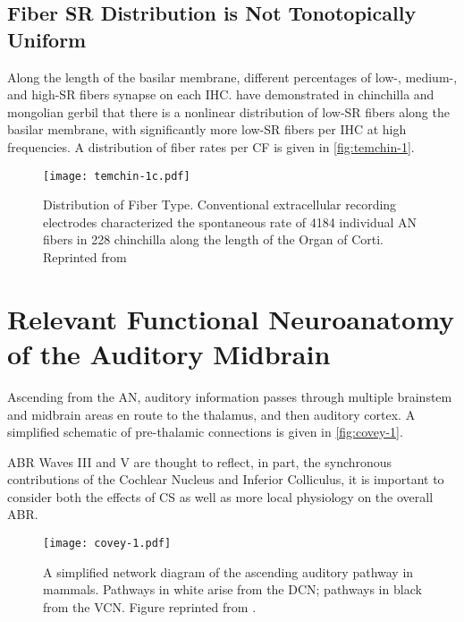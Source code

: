 \subsection{Fiber SR Distribution is Not Tonotopically Uniform} %
\label{sub:fiber_rates_are_tonotopically_nonuniform}
Along the length of the basilar membrane, different percentages of low-, medium-, and high-SR fibers synapse on each IHC.  \cite{Temchin2008Threshold,Temchin2014Spatial,Bourien2014Contribution} have demonstrated in chinchilla and mongolian gerbil that there is a nonlinear distribution of low-SR fibers along the basilar membrane, with significantly more low-SR fibers per IHC at high frequencies.   A distribution of fiber rates per CF is given in \autoref{fig:temchin-1}.

\begin{figure}[htbp]
	\centering
	\texttt{[image: temchin-1c.pdf]}
	\caption[Distribution of Fiber Type]{Distribution of Fiber Type. Conventional extracellular recording electrodes characterized the spontaneous rate of 4184 individual AN fibers in 228 chinchilla along the length of the Organ of Corti. Reprinted from \cite{Temchin2008Threshold}}
	\label{fig:temchin-1}
\end{figure}

\section{Relevant Functional Neuroanatomy of the Auditory Midbrain} %
\label{sec:relevant_functional_neuroanatomy_of_the_auditory_midbrain}
Ascending from the AN, auditory information passes through multiple brainstem and midbrain areas en route to the thalamus, and then auditory cortex.  A simplified schematic of pre-thalamic connections is given in \autoref{fig:covey-1}. 

ABR Waves III and V are thought to reflect, in part, the synchronous contributions of the Cochlear Nucleus and Inferior Colliculus, it is important to consider both the effects of CS as well as more local physiology on the overall ABR.

\begin{figure}[htbp]
	\centering
	\texttt{[image: covey-1.pdf]}
	\caption[Ascending Auditory Pathway]{A simplified network diagram of the ascending auditory pathway in mammals.  Pathways in white arise from the DCN; pathways in black from the VCN.  Figure reprinted from \cite{Covey2008Inputs}.}
	\label{fig:covey-1}
\end{figure}

